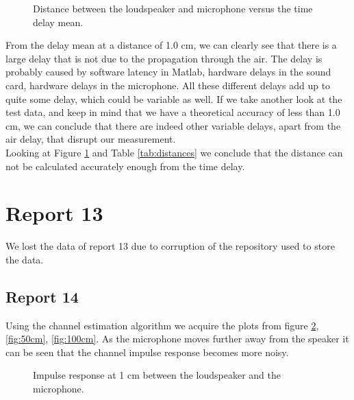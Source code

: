 \documentclass[final]{scrreprt} %
\begin{document}
\begin{figure}[H]
\centering
{}
\caption{Distance between the loudspeaker and microphone versus the time delay mean.}
\label{fig:means}
\end{figure}

From the delay mean at a distance of 1.0 cm, we can clearly see that there is a large delay that is not due to the propagation through the air.
The delay is probably caused by software latency in Matlab, hardware delays in the sound card, hardware delays in the microphone.
All these different delays add up to quite some delay, which could be variable as well.
If we take another look at the test data, and keep in mind that we have a theoretical accuracy of less than 1.0 cm, we can conclude that there are indeed other variable delays, apart from the air delay, that disrupt our measurement.\\ 
Looking at Figure \ref{fig:means} and Table \ref{tab:distances} we conclude that the distance can not be calculated accurately enough from the time delay. 


\section{Report 13}
We lost the data of report 13 due to corruption of the repository used to store the data.
\subsection{Report 14}

Using the channel estimation algorithm we acquire the plots from figure \ref{fig:1cm}, \ref{fig:50cm}, \ref{fig:100cm}. As the microphone moves further away from the speaker it can be seen that the channel impulse response becomes more noisy.

\begin{figure}[H]
	\centering
	\setlength\figureheight{4cm}
    	\setlength{}
	
	\caption{Impulse response at 1 cm between the loudspeaker and the microphone.}
	\label{fig:1cm}
\end{figure}
\end{document}
